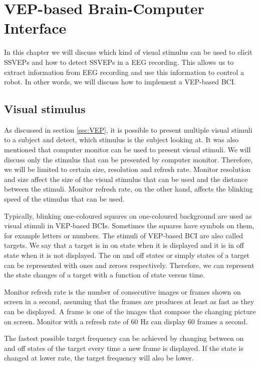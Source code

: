 
\chapter{VEP-based Brain-Computer Interface}

In this chapter we will discuss which kind of visual stimulus can be used to elicit \glspl{SSVEP} and how to detect \glspl{SSVEP} in a \gls{EEG} recording. This allows us to extract information from EEG recording and use this information to control a robot. In other words, we will discuss how to implement a \gls{VEP}-based \gls{BCI}.

\section{Visual stimulus}

As discussed in section \ref{sec:VEP}, it is possible to present multiple visual stimuli to a subject and detect, which stimulus is the subject looking at. It was also mentioned that computer monitor can be used to present visual stimuli. We will discuss only the stimulus that can be presented by computer monitor. Therefore, we will be limited to certain size, resolution and refresh rate. Monitor resolution and size affect the size of the visual stimulus that can be used and the distance between the stimuli. Monitor refresh rate, on the other hand, affects the blinking speed of the stimulus that can be used.

Typically, blinking one-coloured squares on one-coloured background are used as visual stimuli in \gls{VEP}-based \glspl{BCI}. Sometimes the squares have symbols on them, for example letters or numbers. The stimuli of \gls{VEP}-based \gls{BCI} are also called targets. We say that a target is in on state when it is displayed and it is in off state when it is not displayed. The on and off states or simply states of a target can be represented with ones and zeroes respectively. Therefore, we can represent the state changes of a target with a function of state versus time.

Monitor refresh rate is the number of consecutive images or frames shown on screen in a second, assuming that the frames are produces at least as fast as they can be displayed. A frame is one of the images that compose the changing picture on screen. Monitor with a refresh rate of 60 Hz can display 60 frames a second. 

The fastest possible target frequency can be achieved by changing between on and off states of the target every time a new frame is displayed. If the state is changed at lower rate, the target frequency will also be lower.


